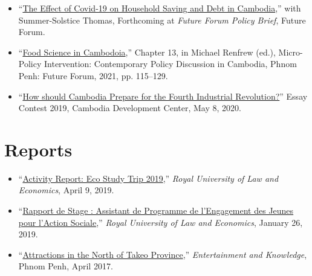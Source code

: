 \documentclass[10pt,a4paper]{article}
\begin{document}
\begin{adjustwidth}{.7cm}{}
	\begin{itemize}[label={},itemindent=-2em,leftmargin=2em]
		\item “\href{https://nithkosal.github.io/research/policies/COVID-19-HHSavingsDebt.pdf}{The Effect of Covid-19 on Household Saving and Debt in Cambodia},” with Summer-Solstice Thomas, Forthcoming at \textit{Future Forum Policy Brief}, Future Forum. 
		
		\item “\href{https://nithkosal.github.io/research/policies/PolicyBrief-FST.pdf}{Food Science in Cambodoia},” Chapter 13, in Michael Renfrew (ed.), Micro-Policy Intervention: Contemporary Policy Discussion in Cambodia, Phnom Penh: Future Forum, 2021, pp. 115–129.
	
		\item ``\href{https://cd-center.org/en/essay-contest-2019-first-place-winner/}{How should Cambodia Prepare for the Fourth Industrial Revolution?}” Essay Contest 2019, Cambodia Development Center, May 8, 2020.
			
		\end{itemize}
	\end{adjustwidth}
	\vspace{-1.5em}
	
\section*{Reports}	
		\vspace{-1em}
		\begin{adjustwidth}{.7cm}{}
			\begin{itemize}[label={},itemindent=-2em,leftmargin=2em]
				
				\item “\href{https://nithkosal.github.io/research/reports/EcoStudy_2019.pdf}{Activity Report: Eco Study Trip 2019},” \textit{Royal University of Law and Economics}, April 9, 2019. 
				
				\item “\href{https://www.researchgate.net/publication/330936932_Rapport_du_Stage_Assistant_de_Programme_a_l%27YRDP}{Rapport de Stage : Assistant de Programme de l'Engagement des Jeunes pour l'Action Sociale},” \textit{Royal University of Law and Economics}, January 26, 2019.
					
				\item “\href{https://www.facebook.com/7khmer/photos/?tab=album&album_id=878953958911035}{Attractions in the North of Takeo Province},” \textit{Entertainment and Knowledge}, Phnom Penh, April 2017. 
					
			\end{itemize}
		\end{adjustwidth}			
		\vspace{-1em}
\end{document}
